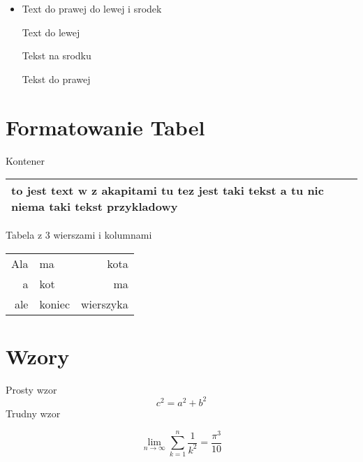 \documentclass[a4paper,11pt]{article}
\begin{document}
\begin{itemize}
\item \huge Text do prawej do lewej i srodek\newline
\begin{flushleft}
\large Text do lewej
\end{flushleft}
\begin{center}
\large Tekst na srodku
\end{center}
\begin{flushright}
\large Tekst do prawej
\end{flushright}
\end{itemize}
\section{Formatowanie Tabel}
\begin{flushleft}

\large \item Kontener \newline \\ 
\begin{tabular}{|p{4.7cm}|} \hline
to jest text w z akapitami 
tu tez jest taki tekst a tu nic niema taki tekst przykladowy
\\ \hline
\end{tabular}

\large \item Tabela z 3 wierszami i kolumnami \newline \\
\begin{tabular}{|r|l|r|} \hline
Ala&  ma & kota \\
a & kot & ma   \\ \hline
ale & koniec & wierszyka \\
\hline 
\end{tabular}
\end{flushleft}


\section{Wzory}
Prosty wzor\\
\begin{displaymath}
c^{2}=a^{2}+b^{2}
\end{displaymath}
Trudny wzor

$$
\lim_{n \to \infty}
\sum_{k=1}^n \frac{1}{k^2}
= \frac{\pi^3}{10}
$$

{}

\nocite{latex2}
\nocite{*}
\end{document}
